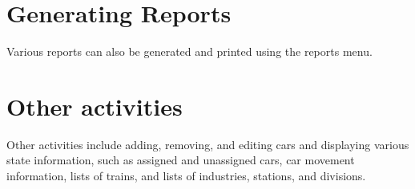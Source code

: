\section{Generating Reports}

Various reports can also be generated and printed using the reports
menu. 

\section{Other activities}

Other activities include adding, removing, and editing cars and
displaying various state information, such as assigned and unassigned
cars, car movement information, lists of trains, and lists of
industries, stations, and divisions.
